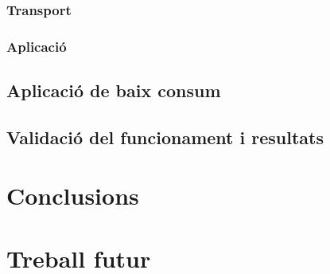 \documentclass{tfgitic}[2025/06/06]
\begin{document}
\subsection{Transport}
\subsection{Aplicació}
\section{Aplicació de baix consum}
\section{Validació del funcionament i resultats}


\chapter{Conclusions}
\chapter{Treball futur}


\printbibliography

\end{document}
